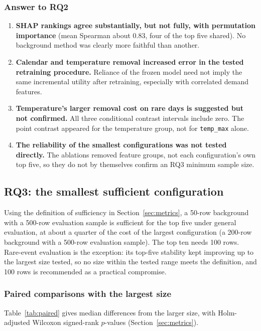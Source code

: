 \documentclass[11pt,a4paper]{article}
\newcommand{\feat}[1]{\texttt{#1}}
\begin{document}
\subsubsection{Answer to RQ2}
\begin{enumerate}
  \item \textbf{SHAP rankings agree substantially, but not fully, with permutation importance} (mean Spearman about 0.83, four of the top five shared). No background method was clearly more faithful than another.
  \item \textbf{Calendar and temperature removal increased error in the tested retraining procedure.} Reliance of the frozen model need not imply the same incremental utility after retraining, especially with correlated demand features.
  \item \textbf{Temperature's larger removal cost on rare days is suggested but not confirmed.} All three conditional contrast intervals include zero. The point contrast appeared for the temperature group, not for \feat{temp\_max} alone.
  \item \textbf{The reliability of the smallest configurations was not tested directly.} The ablations removed feature groups, not each configuration's own top five, so they do not by themselves confirm an RQ3 minimum sample size.
\end{enumerate}

\subsection{RQ3: the smallest sufficient configuration}\label{sec:rq3}

Using the definition of sufficiency in Section~\ref{sec:metrics}, a 50-row background with a 500-row evaluation sample is sufficient for the top five under general evaluation, at about a quarter of the cost of the largest configuration (a 200-row background with a 500-row evaluation sample). The top ten needs 100 rows. Rare-event evaluation is the exception: its top-five stability kept improving up to the largest size tested, so no size within the tested range meets the definition, and 100 rows is recommended as a practical compromise.

\subsubsection{Paired comparisons with the largest size}

Table~\ref{tab:paired} gives median differences from the larger size, with Holm-adjusted Wilcoxon signed-rank $p$-values (Section~\ref{sec:metrics}).
\end{document}
